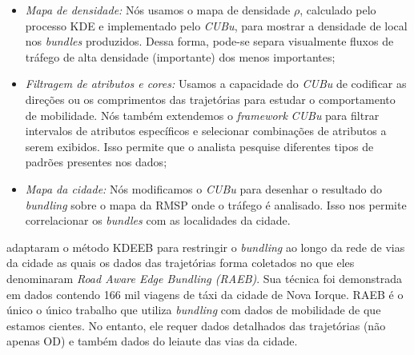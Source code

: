 \begin{itemize}
\item\emph{Mapa de densidade:} Nós usamos o mapa de densidade $\rho$,
calculado pelo processo KDE e implementado pelo \emph{CUBu}, para mostrar a densidade de
local nos \emph{bundles} produzidos. Dessa forma, pode-se separa visualmente
fluxos de tráfego de alta densidade (importante) dos menos importantes;
 
\item\emph{Filtragem de atributos e cores:} Usamos a capacidade do \emph{CUBu} de
codificar as direções ou os comprimentos das trajetórias para
estudar o comportamento de mobilidade. Nós também extendemos o \emph{framework} \emph{CUBu}
para filtrar intervalos de atributos específicos e selecionar combinações de atributos a
serem exibidos. Isso permite que o analista pesquise diferentes tipos de padrões
presentes nos dados;

\item\emph{Mapa da cidade:} Nós modificamos o \emph{CUBu} para desenhar
o resultado do \emph{bundling} sobre o mapa da RMSP onde o tráfego é analisado. Isso nos permite
correlacionar os \emph{bundles} com as localidades da cidade.
\end{itemize}


\cite{zeng:19} adaptaram o método KDEEB para restringir o \emph{bundling}
ao longo da rede de vias da cidade as quais os dados das trajetórias forma
coletados no que eles denominaram \emph{Road Aware Edge
Bundling (RAEB)}. Sua técnica foi demonstrada em dados contendo
166 mil viagens de táxi da cidade de Nova Iorque. RAEB é o único o único
trabalho que utiliza \emph{bundling} com dados de mobilidade de que estamos cientes.
No entanto, ele requer dados detalhados das trajetórias (não apenas OD) e também
dados do leiaute das vias da cidade.


